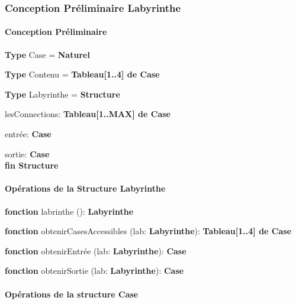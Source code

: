 \subsubsection{Conception Préliminaire Labyrinthe}

\paragraph{Conception Préliminaire}

\noindent\textbf{Type} Case = \textbf{Naturel}

\noindent\textbf{Type} Contenu = \textbf{Tableau[1..4] de Case}

\noindent\textbf{Type} Labyrinthe = \textbf{Structure}

lesConnections: \textbf{Tableau[1..MAX] de Case}

entrée: \textbf{Case}

sortie: \textbf{Case}\\
\textbf{fin Structure}

\paragraph{Opérations de la Structure Labyrinthe}


\textbf{fonction} labrinthe (): \textbf{Labyrinthe}

\textbf{fonction} obtenirCasesAccessibles (lab: \textbf{Labyrinthe}): \textbf{Tableau[1..4] de Case}

\textbf{fonction} obtenirEntrée (lab: \textbf{Labyrinthe}): \textbf{Case}

\textbf{fonction} obtenirSortie (lab: \textbf{Labyrinthe}): \textbf{Case}

\paragraph{Opérations de la structure Case}